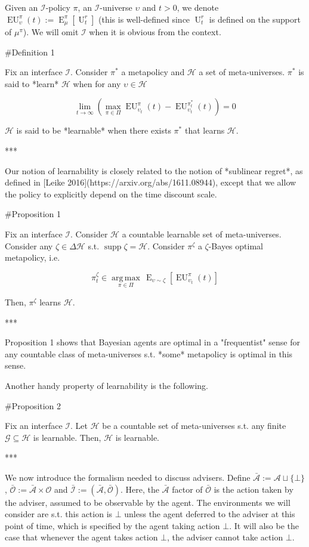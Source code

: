 \documentclass[a4paper]{article}
\DeclareMathOperator{\Supp}{supp}
\DeclareMathOperator{\E}{E}
\newcommand{\Argmax}[1]{\underset{#1}{\operatorname{arg\,max}}\,}
\newcommand{\Ob}{\mathcal{O}}
\newcommand{\A}{\mathcal{A}}
\newcommand{\I}{\mathcal{I}}
\newcommand{\Ado}{\bar{\Ob}}
\newcommand{\Ada}{\bar{\A}}
\newcommand{\Adi}{\bar{\I}}
\newcommand{\Hy}{\mathcal{H}}
\newcommand{\Ut}{\operatorname{U}}
\newcommand{\EU}{\operatorname{EU}}
\begin{document}
Given an $\I$-policy $\pi$, an $\I$-universe $\upsilon$ and $t > 0$, we denote $\EU_\upsilon^\pi(t):=\E_\mu^\pi[\Ut^r_t]$ (this is well-defined since $\Ut^r_t$ is defined on the support of $\mu^\pi$). We will omit $\I$ when it is obvious from the context.

\#Definition 1

Fix an interface $\I$. Consider $\pi^*$ a metapolicy and $\Hy$ a set of meta-universes. $\pi^*$ is said to *learn* $\Hy$ when for any $\upsilon \in \Hy$

$$\lim_{t \rightarrow \infty} (\max_{\pi \in \Pi} \EU_{\upsilon_t}^{\pi}(t) - \EU_{\upsilon_t}^{\pi^*_t}(t)) = 0$$

$\Hy$ is said to be *learnable* when there exists $\pi^*$ that learns $\Hy$.

***

Our notion of learnability is closely related to the notion of *sublinear regret*, as defined in [Leike 2016](https://arxiv.org/abs/1611.08944), except that we allow the policy to explicitly depend on the time discount scale.

\#Proposition 1

Fix an interface $\I$. Consider $\Hy$ a countable learnable set of meta-universes. Consider any $\zeta \in \Delta\Hy$ s.t. $\Supp \zeta = \Hy$. Consider $\pi^\zeta$ a $\zeta$-Bayes optimal metapolicy, i.e.

$$\pi^\zeta_t \in \Argmax{\pi \in \Pi} \E_{\upsilon \sim \zeta}[\EU_{\upsilon_t}^{\pi}(t)]$$

Then, $\pi^\zeta$ learns $\Hy$.

***

Proposition 1 shows that Bayesian agents are optimal in a "frequentist" sense for any countable class of meta-universes s.t. *some* metapolicy is optimal in this sense.

Another handy property of learnability is the following.

\#Proposition 2

Fix an interface $\I$. Let $\Hy$ be a countable set of meta-universes s.t. any finite $\mathcal{G} \subseteq \Hy$ is learnable. Then, $\Hy$ is learnable.

***

We now introduce the formalism needed to discuss advisers. Define $\Ada:=\A \sqcup \{\bot\}$, $\Ado:=\Ada \times \Ob$ and $\Adi:=(\Ada,\Ado)$. Here, the $\Ada$ factor of $\Ado$ is the action taken by the adviser, assumed to be observable by the agent. The environments we will consider are s.t. this action is $\bot$ unless the agent deferred to the adviser at this point of time, which is specified by the agent taking action $\bot$. It will also be the case that whenever the agent takes action $\bot$, the adviser cannot take action $\bot$.
\end{document}

